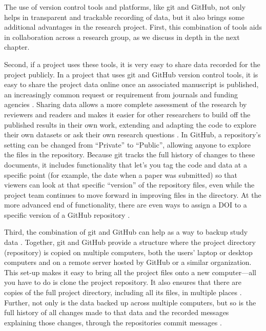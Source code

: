 \documentclass[]{tufte-book}
\begin{document}
The use of version control tools and platforms, like git and GitHub, not only
helps in transparent and trackable recording of data, but it also brings some
additional advantages in the research project. First, this combination of tools
aids in collaboration across a research group, as we discuss in depth in the next
chapter.

Second, if a project uses these tools, it is very easy to share data recorded
for the project publicly. In a project that uses git and GitHub version control
tools, it is easy to share the project data online once an associated manuscript
is published, an increasingly common request or requirement from journals and
funding agencies \citep{blischak2016quick}. Sharing data allows a more
complete assessment of the research by reviewers and readers and makes it easier
for other researchers to build off the published results in their own work,
extending and adapting the code to explore their own datasets or ask their own
research questions \citep{perez2016ten}. In GitHub, a repository's setting can be
changed from ``Private'' to ``Public'', allowing anyone to explore the files in the
repository. Because git tracks the full history of changes to these documents,
it includes functionality that let's you tag the code and data at a specific
point (for example, the date when a paper was submitted) so that viewers can
look at that specific ``version'' of the repository files, even while the project
team continues to move forward in improving files in the directory. At the more
advanced end of functionality, there are even ways to assign a DOI to a specific
version of a GitHub repository \citep{perez2016ten}.

Third, the combination of git and GitHub can help as a way to backup study data
\citep{blischak2016quick, perez2016ten, perkel2018git}. Together, git and GitHub
provide a structure where the project directory (repository) is copied on
multiple computers, both the users' laptop or desktop computers and on a remote
server hosted by GitHub or a similar organization. This set-up makes it easy to
bring all the project files onto a new computer---all you have to do is clone
the project repository. It also ensures that there are copies of the full
project directory, including all its files, in multiple places
\citep{blischak2016quick}. Further, not only is the data backed up across multiple
computers, but so is the full history of all changes made to that data and the
recorded messages explaining those changes, through the repositories commit
messages \citep{perez2016ten}.
\end{document}
